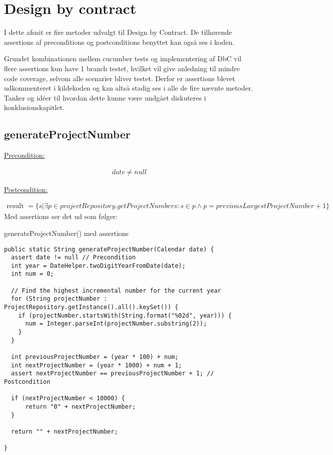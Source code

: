 \section{Design by contract}\label{chap:design_by_contract}

I dette afsnit er fire metoder udvalgt til Design by Contract. De tilhørende assertions af preconditions og postconditions benyttet kan også ses i koden. 

Grundet kombinationen mellem cucumber tests og implementering af DbC vil flere assertions kun have 1 branch testet, hvilket vil give anledning til mindre code coverage, selvom alle scenarier bliver testet. Derfor er assertions blevet udkommenteret i kildekoden og kan altså stadig ses i alle de fire nævnte metoder. Tanker og idéer til hvordan dette kunne være undgået diskuteres i konklusionskapitlet.


\subsection{generateProjectNumber} \label{sec:contract_generate_project_number}
\underline{Precondition:}
\vspace{4pt}

\begin{align}
    date \neq null
\end{align}
\vspace{4pt}

\noindent
\underline{Postcondition:}
\vspace{4pt}

\begin{align}
    \text{result } = \{s|\exists p \in projectRepository.getProjectNumbers : s \in p \land p = previousLargestProjectNumber + 1\}
\end{align}
\newline
\noindent
Med assertions ser det ud som følger:

\begin{listing}[H]
    \centering
    \caption{generateProjectNumber() med assertions}\label{lst:cgenerate_project_number_assertions}
    \begin{verbatim}
public static String generateProjectNumber(Calendar date) {
  assert date != null // Precondition
  int year = DateHelper.twoDigitYearFromDate(date);
  int num = 0;

  // Find the highest incremental number for the current year
  for (String projectNumber : ProjectRepository.getInstance().all().keySet()) {
    if (projectNumber.startsWith(String.format("%02d", year))) {
      num = Integer.parseInt(projectNumber.substring(2));
    }
  }

  int previousProjectNumber = (year * 100) + num;
  int nextProjectNumber = (year * 1000) + num + 1;
  assert nextProjectNumber == previousProjectNumber + 1; // Postcondition
  
  if (nextProjectNumber < 10000) {
      return "0" + nextProjectNumber;
  }

  return "" + nextProjectNumber;

}
    \end{verbatim}
\end{listing}
